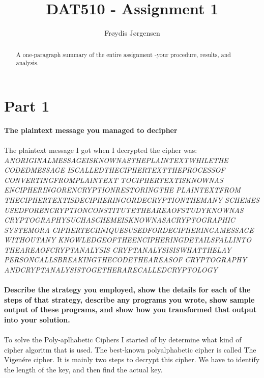 \documentclass[12pt, letterpaper]{article}
\title{DAT510 - Assignment 1}
\author{Frøydis Jørgensen}
\begin{document}
\begin{titlepage}
\maketitle
\end{titlepage}


\begin{abstract}
A one-paragraph summary of the entire assignment -your procedure, results, and analysis. 
\end{abstract}

\section*{Part 1}
\textbf{The plaintext message you managed to decipher} \\
\\
The plaintext message I got when I decrypted the cipher was:\\
\textit{
ANORIGINALMESSAGEISKNOWNASTHEPLAINTEXTWHILETHE\\CODEDMESSAGE
ISCALLEDTHECIPHERTEXTTHEPROCESSOF\\CONVERTINGFROMPLAINTEXT
TOCIPHERTEXTISKNOWNAS\\ENCIPHERINGORENCRYPTIONRESTORINGTHE
PLAINTEXTFROM\\THECIPHERTEXTISDECIPHERINGORDECRYPTIONTHEMANY
SCHEMES\\USEDFORENCRYPTIONCONSTITUTETHEAREAOFSTUDYKNOWNAS
CRYPTOGRAPHYSUCHASCHEMEISKNOWNASACRYPTOGRAPHIC\\SYSTEMORA
CIPHERTECHNIQUESUSEDFORDECIPHERINGAMESSAGE\\WITHOUTANY
KNOWLEDGEOFTHEENCIPHERINGDETAILSFALLINTO\\THEAREAOFCRYPTANALYSIS
CRYPTANALYSISISWHATTHELAY\\PERSONCALLSBREAKINGTHECODETHEAREASOF
CRYPTOGRAPHY\\ANDCRYPTANALYSISTOGETHERARECALLEDCRYPTOLOGY}\\
\\
\textbf{Describe the strategy you employed, show the details for each of the steps of that strategy, describe any programs you wrote, show sample output of these programs, and show how you transformed that output into your solution.} \\
\\
To solve the Poly-aplhabetic Ciphers I started of by determine what kind of cipher algoritm that is used.
The best-known polyalphabetic cipher is called The Vigenére cipher. It is mainly two steps to decrypt this cipher.
We have to identify the length of the key, and then find the actual key. 
\end{document}
